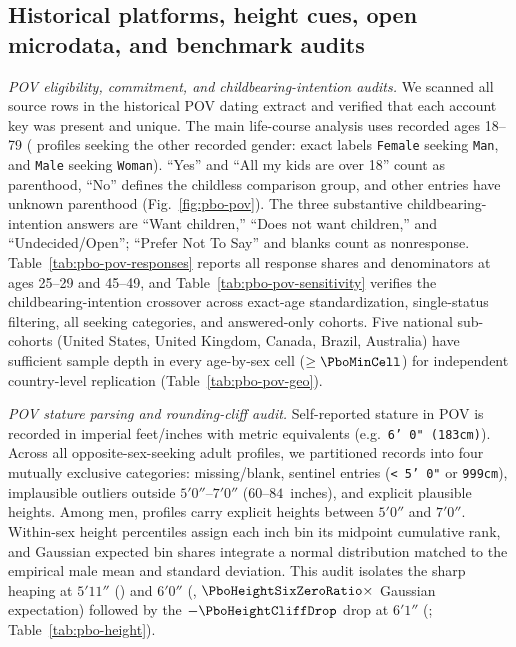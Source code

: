 \subsection{Historical platforms, height cues, open microdata, and benchmark audits}\label{sec:platformmethods}

\emph{POV eligibility, commitment, and childbearing-intention audits.} We scanned all \PboPovRows{} source rows in the
historical POV dating extract and verified that each account key was present and unique. The main life-course analysis uses
recorded ages 18--79 (\PboPovEligible{} profiles seeking the other recorded gender: exact labels \texttt{Female} seeking
\texttt{Man}, and \texttt{Male} seeking \texttt{Woman}). ``Yes'' and ``All my kids are over 18'' count as parenthood,
``No'' defines the childless comparison group, and other entries have unknown parenthood (Fig.~\ref{fig:pbo-pov}). The three
substantive childbearing-intention answers are ``Want children,'' ``Does not want children,'' and ``Undecided/Open'';
``Prefer Not To Say'' and blanks count as nonresponse. Table~\ref{tab:pbo-pov-responses} reports all response shares and
denominators at ages 25--29 and 45--49, and Table~\ref{tab:pbo-pov-sensitivity} verifies the childbearing-intention
crossover across exact-age standardization, single-status filtering, all seeking categories, and answered-only cohorts. Five
national sub-cohorts (United States, United Kingdom, Canada, Brazil, Australia) have sufficient sample depth in every age-by-sex
cell ($\ge\PboMinCell$) for independent country-level replication (Table~\ref{tab:pbo-pov-geo}).

\emph{POV stature parsing and rounding-cliff audit.} Self-reported stature in POV is recorded in imperial feet/inches with
metric equivalents (e.g.\ \texttt{6' 0" (183cm)}). Across all \PboPovEligible{} opposite-sex-seeking adult profiles, we
partitioned records into four mutually exclusive categories: missing/blank, sentinel entries (\texttt{< 5' 0"} or
\texttt{999cm}), implausible outliers outside $5'0''$--$7'0''$ ($60$--$84$~inches), and explicit plausible heights. Among
men, \PboHeightMenN{} profiles carry explicit heights between $5'0''$ and $7'0''$. Within-sex height percentiles assign each
inch bin its midpoint cumulative rank, and Gaussian expected bin shares integrate a normal distribution matched to the
empirical male mean and standard deviation. This audit isolates the sharp heaping at $5'11''$ (\PboHeightFiveElevenN) and
$6'0''$ (\PboHeightSixZeroN, $\PboHeightSixZeroRatio\times$ Gaussian expectation) followed by the $-\PboHeightCliffDrop$
drop at $6'1''$ (\PboHeightSixOneN; Table~\ref{tab:pbo-height}).

